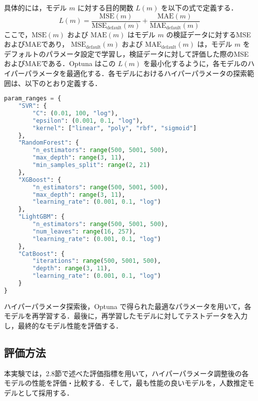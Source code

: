具体的には，モデル \( m \) に対する目的関数 \( L(m) \) を以下の式で定義する．
\begin{equation}
L(m) = \frac{\mathrm{MSE}(m)}{\mathrm{MSE}_{\mathrm{default}}(m)} + \frac{\mathrm{MAE}(m)}{\mathrm{MAE}_{\mathrm{default}}(m)}
\end{equation}
ここで，\( \mathrm{MSE}(m) \) および \( \mathrm{MAE}(m) \) はモデル \( m \) の検証データに対するMSEおよびMAEであり，  
\( \mathrm{MSE}_{\mathrm{default}}(m) \) および \( \mathrm{MAE}_{\mathrm{default}}(m) \) は，モデル \( m \) をデフォルトのパラメータ設定で学習し，検証データに対して評価した際のMSEおよびMAEである．Optuna はこの \( L(m) \) を最小化するように，各モデルのハイパーパラメータを最適化する．各モデルにおけるハイパーパラメータの探索範囲は、以下のとおり定義する．
\begin{lstlisting}[style=mystyle, language=Python, caption=各モデルのハイパーパラメータ探索範囲]
param_ranges = {
    "SVR": {
        "C": (0.01, 100, "log"),
        "epsilon": (0.001, 0.1, "log"),
        "kernel": ["linear", "poly", "rbf", "sigmoid"]
    },
    "RandomForest": {
        "n_estimators": range(500, 5001, 500),
        "max_depth": range(3, 11),
        "min_samples_split": range(2, 21)
    },
    "XGBoost": {
        "n_estimators": range(500, 5001, 500),
        "max_depth": range(3, 11),
        "learning_rate": (0.001, 0.1, "log")
    },
    "LightGBM": {
        "n_estimators": range(500, 5001, 500),
        "num_leaves": range(16, 257),
        "learning_rate": (0.001, 0.1, "log")
    },
    "CatBoost": {
        "iterations": range(500, 5001, 500),
        "depth": range(3, 11),
        "learning_rate": (0.001, 0.1, "log")
    }
}
\end{lstlisting}
ハイパーパラメータ探索後，Optuna で得られた最適なパラメータを用いて，各モデルを再学習する．最後に，再学習したモデルに対してテストデータを入力し，最終的なモデル性能を評価する．

\subsection{評価方法}
本実験では，2.8節で述べた評価指標を用いて，ハイパーパラメータ調整後の各モデルの性能を評価・比較する．そして，最も性能の良いモデルを，人数推定モデルとして採用する．

